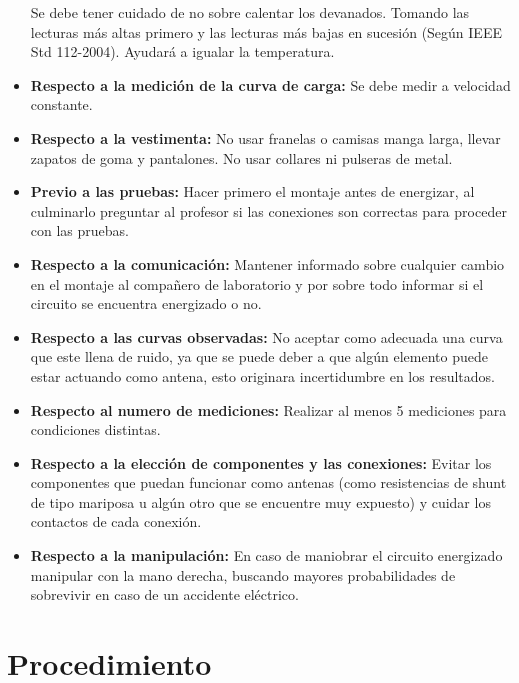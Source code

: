 \documentclass[11pt,letterpaper]{article}     %
\begin{document}
\begin{itemize}
    Se debe tener cuidado de no sobre calentar los devanados. Tomando las lecturas más altas primero y las lecturas más bajas en sucesión (Según IEEE Std 112-2004). Ayudará a igualar la temperatura.
    \item \textbf{Respecto a la medición de la curva de carga:} Se debe medir a velocidad constante.
    \item \textbf{Respecto a la  vestimenta:} No usar franelas o camisas manga larga, llevar zapatos de goma y pantalones. No usar collares ni pulseras de metal.
    \item \textbf{Previo a las pruebas:} Hacer primero el montaje antes de energizar, al culminarlo preguntar al profesor si las conexiones son correctas para proceder con las pruebas.
    \item \textbf{Respecto a la comunicación:} Mantener informado sobre cualquier cambio en el montaje al compañero de laboratorio y por sobre todo informar si el circuito se encuentra energizado o no.
	\item \textbf{Respecto a las curvas observadas:} No aceptar como adecuada una curva que este llena de ruido, ya que se puede deber a que algún elemento puede estar actuando como antena, esto originara incertidumbre en los resultados.
	\item \textbf{Respecto al numero de mediciones:}
	Realizar al menos 5 mediciones para condiciones distintas.
	\item \textbf{Respecto a la elección de componentes y las conexiones:} Evitar los componentes que puedan funcionar como antenas (como resistencias de shunt de tipo mariposa u algún otro que se encuentre muy expuesto) y cuidar los contactos de cada conexión.
    \item \textbf{Respecto a la manipulación:} En caso de maniobrar el circuito energizado manipular con la mano derecha, buscando mayores probabilidades de sobrevivir en caso de un accidente eléctrico.
\end{itemize}
\section{Procedimiento}
\end{document}
